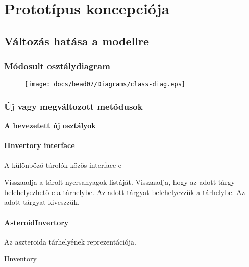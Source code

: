 \documentclass[../../projlab]{subfiles}
\begin{document}
\makeatletter


\makeatother


\chapter{Prototípus koncepciója}
\setcounter{section}{-1}

\section{Változás hatása a modellre}

\subsection{Módosult osztálydiagram}
\begin{figure}[H] 
    \centering 
    \texttt{[image: docs/bead07/Diagrams/class-diag.eps]} 
    \caption{} 
\end{figure} 

\subsection{Új vagy megváltozott metódusok}

\textbf{A bevezetett új osztályok}

\subsubsection{IInvertory interface}
\begin{class-template-responsibility}
    A különböző tárolók közös interface-e
\end{class-template-responsibility}
\begin{class-template-method}
                {Visszaadja a tárolt nyersanyagok listáját.}
                {Visszaadja, hogy az adott tárgy belehelyezhető-e a tárhelybe.}
                {Az adott tárgyat belehelyezzük a tárhelybe.}
                {Az adott tárgyat kiveszzük.}                
\end{class-template-method}

\subsubsection{AsteroidInvertory}
\begin{class-template-responsibility}
    Az aszteroida tárhelyének reprezentációja.
\end{class-template-responsibility}
\begin{class-template-interface}
    IInventory
\end{class-template-interface}
\begin{class-template-attribute}
\end{class-template-attribute}
\end{document}
